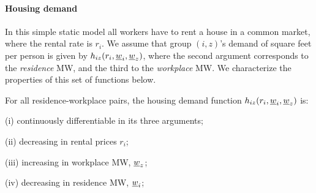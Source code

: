 \paragraph{Housing demand}

In this simple static model all workers have to rent a house in a common market, 
where the rental rate is $r_i$. 
We assume that group $(i,z)$'s demand of square feet per person is given by $h_{iz} (r_i, 
\underline{w}_i, \underline{w}_z)$, where the second argument corresponds to the \textit{residence} MW, and 
the third to the \textit{workplace} MW. 
We characterize the properties of this set of functions below.

\begin{assu}\label{assu:housing_function}
	For all residence-workplace pairs, the housing demand function $h_{iz} (r_i, 	
	\underline{w}_i, \underline{w}_z)$ is:
	 
	(i) continuously differentiable in its three arguments;
	
	(ii) decreasing in rental prices $r_i$;
	
	(iii) increasing in workplace MW, $\underline{w}_z$;
	
	(iv) decreasing in residence MW, $\underline{w}_i$;
\end{assu}

